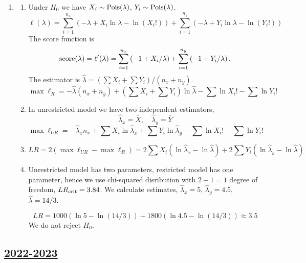 \begin{enumerate}
\begin{enumerate}
\end{enumerate}

\item 
\begin{enumerate}
    \item Under $H_0$ we have $X_i \sim \mathrm{Pois}(\lambda)$, $Y_i \sim \mathrm{Pois}(\lambda)$.
    \[
        \ell(\lambda) = \sum_{i=1}^{n_x} \left( -\lambda + X_i \ln \lambda - \ln (X_i!)\right) + 
        \sum_{i=1}^{n_y} \left( -\lambda + Y_i \ln \lambda - \ln (Y_i!)\right)       
    \]
    The score function is 
    \[
    \mathrm{score}(\lambda) = \ell'(\lambda) = \sum_{i=1}^{n_x} \left( -1 + X_i / \lambda\right) + \sum_{i=1}^{n_y} \left( -1 + Y_i / \lambda\right).
    \]
    The estimator is $\hat \lambda = (\sum X_i + \sum Y_i) / (n_x + n_y)$.
    \[
    \max \ell_R = - \hat \lambda (n_x + n_y) + \left(\sum X_i + \sum Y_i \right)\ln \hat\lambda - \sum \ln X_i! - \sum \ln Y_i!    
    \]
    
    \item In unrestricted model we have two independent estimators, 
    \[
    \hat \lambda_x = \bar X, \quad \hat \lambda_y = \bar Y    
    \]
    \[
    \max \ell_{UR} = - \hat \lambda_x n_x + \sum X_i \ln \hat\lambda_x + \sum Y_i \ln \hat\lambda_y - \sum \ln X_i! - \sum \ln Y_i!    
    \]

    \item 
    \[
    LR = 2(\max \ell_{UR} - \max \ell_R) = 2 \sum X_i (\ln \hat \lambda_x - \ln \hat\lambda) + 2 \sum Y_i (\ln \hat \lambda_y - \ln \hat\lambda)
    \]
    \item Unrestricted model has two parameters, restricted model has one parameter, 
    hence we use chi-squared disribution with $2 - 1 = 1$ degree of freedom, $LR_{\mathrm{crit}} = 3.84$.
    We calculate estimates, $\hat \lambda_x = 5$, $\hat\lambda_y = 4.5$, $\hat\lambda = 14/3$.
    
    \[
    LR = 1000 (\ln 5 - \ln (14/3)) + 1800 (\ln 4.5 - \ln (14/3)) \approx 3.5
    \]
    We do not reject $H_0$.
    


\end{enumerate}

\end{enumerate}



\subsection[2022-2023]{\hyperref[sec:kr_04_2022_2023]{2022-2023}}
\label{sec:sol_kr_04_2022_2023} %



